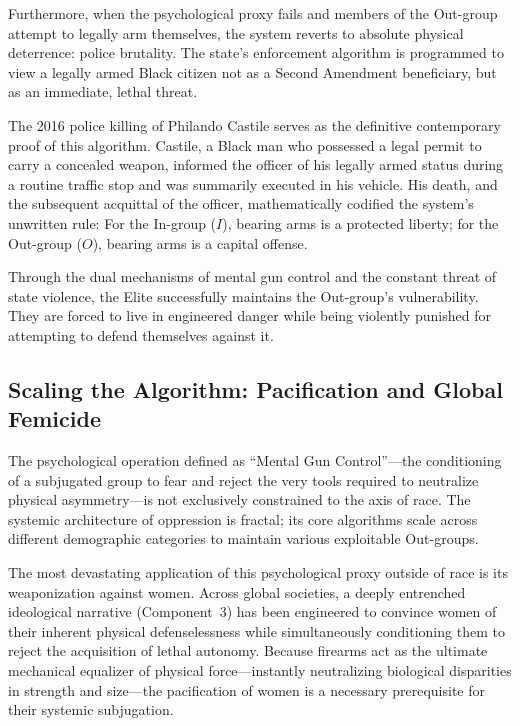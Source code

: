 \documentclass[12pt,openany]{book}
\begin{document}
Furthermore, when the psychological proxy fails and members of the Out-group attempt to legally arm themselves, the system reverts to absolute physical deterrence: police brutality. The state's enforcement algorithm is programmed to view a legally armed Black citizen not as a Second Amendment beneficiary, but as an immediate, lethal threat.

The 2016 police killing of Philando Castile serves as the definitive contemporary proof of this algorithm. Castile, a Black man who possessed a legal permit to carry a concealed weapon, informed the officer of his legally armed status during a routine traffic stop and was summarily executed in his vehicle. His death, and the subsequent acquittal of the officer, mathematically codified the system's unwritten rule: For the In-group ($I$), bearing arms is a protected liberty; for the Out-group ($O$), bearing arms is a capital offense.

Through the dual mechanisms of mental gun control and the constant threat of state violence, the Elite successfully maintains the Out-group's vulnerability. They are forced to live in engineered danger while being violently punished for attempting to defend themselves against it.

\subsection{Scaling the Algorithm: Pacification and Global Femicide}

The psychological operation defined as ``Mental Gun Control''---the conditioning of a subjugated group to fear and reject the very tools required to neutralize physical asymmetry---is not exclusively constrained to the axis of race. The systemic architecture of oppression is fractal; its core algorithms scale across different demographic categories to maintain various exploitable Out-groups.

The most devastating application of this psychological proxy outside of race is its weaponization against women. Across global societies, a deeply entrenched ideological narrative (Component~3) has been engineered to convince women of their inherent physical defenselessness while simultaneously conditioning them to reject the acquisition of lethal autonomy. Because firearms act as the ultimate mechanical equalizer of physical force---instantly neutralizing biological disparities in strength and size---the pacification of women is a necessary prerequisite for their systemic subjugation.
\end{document}
